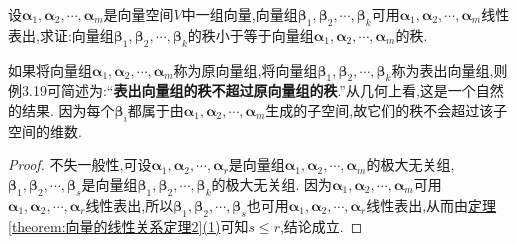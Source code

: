 \documentclass[lang=cn,newtx,10pt,scheme=chinese]{elegantbook}
\begin{document}
\begin{proposition}\label{proposition:表出向量组的秩不超过原向量组的秩}
设\(\boldsymbol{\alpha}_1,\boldsymbol{\alpha}_2,\cdots,\boldsymbol{\alpha}_m\)是向量空间\(V\)中一组向量,向量组\(\boldsymbol{\beta}_1,\boldsymbol{\beta}_2,\cdots,\boldsymbol{\beta}_k\)可用\(\boldsymbol{\alpha}_1,\boldsymbol{\alpha}_2,\cdots,\boldsymbol{\alpha}_m\)线性表出,求证:向量组\(\boldsymbol{\beta}_1,\boldsymbol{\beta}_2,\cdots,\boldsymbol{\beta}_k\)的秩小于等于向量组\(\boldsymbol{\alpha}_1,\boldsymbol{\alpha}_2,\cdots,\boldsymbol{\alpha}_m\)的秩.
\end{proposition}
\begin{remark}
    如果将向量组\(\boldsymbol{\alpha}_1,\boldsymbol{\alpha}_2,\cdots,\boldsymbol{\alpha}_m\)称为原向量组,将向量组\(\boldsymbol{\beta}_1,\boldsymbol{\beta}_2,\cdots,\boldsymbol{\beta}_k\)称为表出向量组,则例3.19可简述为:“\textbf{表出向量组的秩不超过原向量组的秩}.”从几何上看,这是一个自然的结果. 因为每个\(\boldsymbol{\beta}_i\)都属于由\(\boldsymbol{\alpha}_1,\boldsymbol{\alpha}_2,\cdots,\boldsymbol{\alpha}_m\)生成的子空间,故它们的秩不会超过该子空间的维数.
\end{remark}
\begin{proof}
    不失一般性,可设\(\boldsymbol{\alpha}_1,\boldsymbol{\alpha}_2,\cdots,\boldsymbol{\alpha}_r\)是向量组\(\boldsymbol{\alpha}_1,\boldsymbol{\alpha}_2,\cdots,\boldsymbol{\alpha}_m\)的极大无关组,\(\boldsymbol{\beta}_1,\boldsymbol{\beta}_2,\cdots,\boldsymbol{\beta}_s\)是向量组\(\boldsymbol{\beta}_1,\boldsymbol{\beta}_2,\cdots,\boldsymbol{\beta}_k\)的极大无关组. 因为\(\boldsymbol{\alpha}_1,\boldsymbol{\alpha}_2,\cdots,\boldsymbol{\alpha}_m\)可用\(\boldsymbol{\alpha}_1,\boldsymbol{\alpha}_2,\cdots,\boldsymbol{\alpha}_r\)线性表出,所以\(\boldsymbol{\beta}_1,\boldsymbol{\beta}_2,\cdots,\boldsymbol{\beta}_s\)也可用\(\boldsymbol{\alpha}_1,\boldsymbol{\alpha}_2,\cdots,\boldsymbol{\alpha}_r\)线性表出,从而由\hyperref[theorem:向量的线性关系定理2]{定理\ref{theorem:向量的线性关系定理2}(1)}可知\(s\leq r\),结论成立.
\end{proof}
\end{document}
